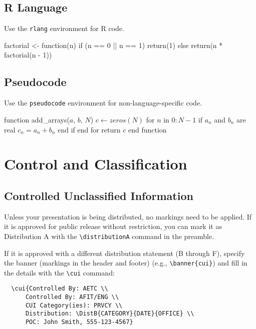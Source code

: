 \documentclass{sysubeamer}
\begin{document}
\section{R Language}

Use the \verb|rlang| environment for R code.
\begin{rlang}
factorial <- function(n) {
    if (n == 0 || n == 1) {
        return(1)
    } else {
        return(n * factorial(n - 1))
    }
}
\end{rlang}

\section{Pseudocode}

Use the \verb|pseudocode| environment for non-language-specific code.
\begin{pseudocode}
function add_arrays($a$, $b$, $N$)
    $c \gets zeros(N)$
    for $n$ in $0:N-1$
        if $a_n$ and $b_n$ are real
            $c_n = a_n + b_n$
        end if
    end for
    return $c$
end function
\end{pseudocode}

\chapter{Control and Classification}

\section{Controlled Unclassified Information}

Unless your presentation is being distributed, no markings need to be applied.
If it is approved for public release without restriction, you can mark it as
Distribution A with the \verb|\distributionA| command in the preamble.

If it is approved with a different distribution statement (B through F), specify
the banner (markings in the header and footer) (e.g., \verb|\banner{cui}|) and
fill in the details with the \verb|\cui| command:
\begin{verbatim}
  \cui{Controlled By: AETC \\
      Controlled By: AFIT/ENG \\
      CUI Category(ies): PRVCY \\
      Distribution: \DistB{CATEGORY}{DATE}{OFFICE} \\
      POC: John Smith, 555-123-4567}
\end{verbatim}
\end{document}
